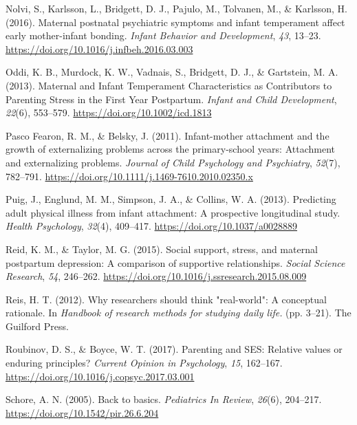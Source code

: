 \documentclass[
]{article}
\newlength{\cslhangindent}
\newenvironment{CSLReferences}[2] %
 {\begin{list}{}{%
  \setlength{\itemindent}{0pt}
  \setlength{\leftmargin}{0pt}
  \setlength{\parsep}{0pt}
  \ifodd #1
   \setlength{\leftmargin}{\cslhangindent}
   \setlength{\itemindent}{-1\cslhangindent}
  \fi
  \setlength{\itemsep}{#2\baselineskip}}}
 {\end{list}}
\begin{document}
\begin{CSLReferences}{1}{0}
Nolvi, S., Karlsson, L., Bridgett, D. J., Pajulo, M., Tolvanen, M., \&
Karlsson, H. (2016). Maternal postnatal psychiatric symptoms and infant
temperament affect early mother-infant bonding. \emph{Infant Behavior
and Development}, \emph{43}, 13--23.
\url{https://doi.org/10.1016/j.infbeh.2016.03.003}

Oddi, K. B., Murdock, K. W., Vadnais, S., Bridgett, D. J., \& Gartstein,
M. A. (2013). Maternal and {Infant} {Temperament} {Characteristics} as
{Contributors} to {Parenting} {Stress} in the {First} {Year}
{Postpartum}. \emph{Infant and Child Development}, \emph{22}(6),
553--579. \url{https://doi.org/10.1002/icd.1813}

Pasco Fearon, R. M., \& Belsky, J. (2011). Infant-mother attachment and
the growth of externalizing problems across the primary-school years:
{Attachment} and externalizing problems. \emph{Journal of Child
Psychology and Psychiatry}, \emph{52}(7), 782--791.
\url{https://doi.org/10.1111/j.1469-7610.2010.02350.x}

Puig, J., Englund, M. M., Simpson, J. A., \& Collins, W. A. (2013).
Predicting adult physical illness from infant attachment: {A}
prospective longitudinal study. \emph{Health Psychology}, \emph{32}(4),
409--417. \url{https://doi.org/10.1037/a0028889}

Reid, K. M., \& Taylor, M. G. (2015). Social support, stress, and
maternal postpartum depression: {A} comparison of supportive
relationships. \emph{Social Science Research}, \emph{54}, 246--262.
\url{https://doi.org/10.1016/j.ssresearch.2015.08.009}

Reis, H. T. (2012). Why researchers should think "real-world": {A}
conceptual rationale. In \emph{Handbook of research methods for studying
daily life.} (pp. 3--21). The Guilford Press.

Roubinov, D. S., \& Boyce, W. T. (2017). Parenting and {SES}: {Relative}
values or enduring principles? \emph{Current Opinion in Psychology},
\emph{15}, 162--167. \url{https://doi.org/10.1016/j.copsyc.2017.03.001}

Schore, A. N. (2005). Back to basics. \emph{Pediatrics In Review},
\emph{26}(6), 204--217. \url{https://doi.org/10.1542/pir.26.6.204}


\end{CSLReferences}
\end{document}
